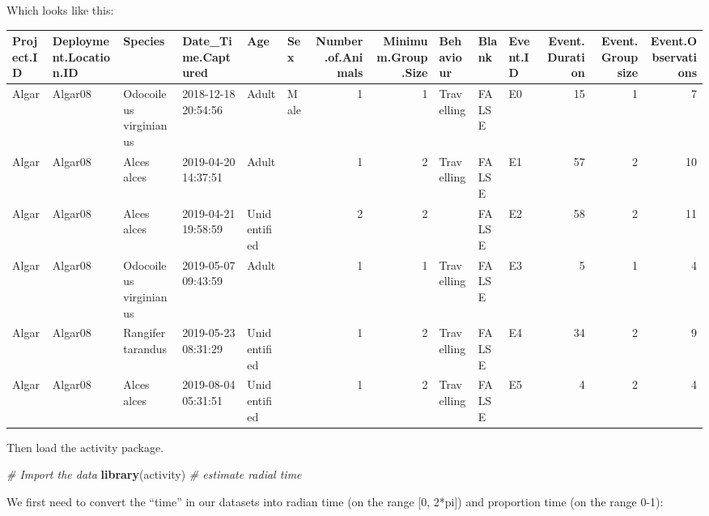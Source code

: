 \documentclass[]{book}
\newenvironment{Shaded}{\begin{snugshade}}{\end{snugshade}}
\newcommand{\KeywordTok}[1]{\textcolor[rgb]{0.13,0.29,0.53}{\textbf{#1}}}
\newcommand{\StringTok}[1]{\textcolor[rgb]{0.31,0.60,0.02}{#1}}
\newcommand{\CommentTok}[1]{\textcolor[rgb]{0.56,0.35,0.01}{\textit{#1}}}
\newcommand{\OperatorTok}[1]{\textcolor[rgb]{0.81,0.36,0.00}{\textbf{#1}}}
\newcommand{\NormalTok}[1]{#1}
\begin{document}
Which looks like this:

\begin{table}
\centering
\begin{tabular}[t]{l|l|l|l|l|l|r|r|l|l|l|r|r|r}
\hline
Project.ID & Deployment.Location.ID & Species & Date\_Time.Captured & Age & Sex & Number.of.Animals & Minimum.Group.Size & Behaviour & Blank & Event.ID & Event.Duration & Event.Groupsize & Event.Observations\\
\hline
Algar & Algar08 & Odocoileus virginianus & 2018-12-18 20:54:56 & Adult & Male & 1 & 1 & Travelling & FALSE & E0 & 15 & 1 & 7\\
\hline
Algar & Algar08 & Alces alces & 2019-04-20 14:37:51 & Adult &  & 1 & 2 & Travelling & FALSE & E1 & 57 & 2 & 10\\
\hline
Algar & Algar08 & Alces alces & 2019-04-21 19:58:59 & Unidentified &  & 2 & 2 &  & FALSE & E2 & 58 & 2 & 11\\
\hline
Algar & Algar08 & Odocoileus virginianus & 2019-05-07 09:43:59 & Adult &  & 1 & 1 & Travelling & FALSE & E3 & 5 & 1 & 4\\
\hline
Algar & Algar08 & Rangifer tarandus & 2019-05-23 08:31:29 & Unidentified &  & 1 & 2 & Travelling & FALSE & E4 & 34 & 2 & 9\\
\hline
Algar & Algar08 & Alces alces & 2019-08-04 05:31:51 & Unidentified &  & 1 & 2 & Travelling & FALSE & E5 & 4 & 2 & 4\\
\hline
\end{tabular}
\end{table}

Then load the activity package.

\begin{Shaded}
\begin{Highlighting}[]
\CommentTok{# Import the data}
\KeywordTok{library}\NormalTok{(activity) }\CommentTok{# estimate radial time}
\end{Highlighting}
\end{Shaded}

We first need to convert the ``time'' in our datasets into radian time
(on the range {[}0, 2*pi{]}) and proportion time (on the range 0-1):

\begin{Shaded}
\end{Shaded}
\end{document}
